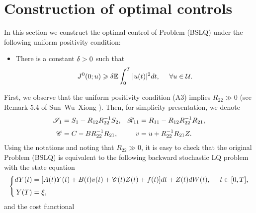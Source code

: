 \documentclass[11pt,times,twoside]{article}
\def\dbE{\mathbb{E}} \def\sE{\mathscr{E}} \def\fE{\mathfrak{E}} \def\cE{{\cal E}} \def\BE{{\bf E}} \def\Be{{\bf e}}
\def\ges{\geqslant}       \def\esssup{\mathop{\rm esssup}}   \def\[{\Big[}
\def\ba{\begin{aligned}}              \def\ea{\end{aligned}}
\begin{document}
\section{Construction of optimal controls}

In this section we construct the optimal control of Problem (BSLQ) under the following uniform
positivity condition:
%
\begin{itemize}
  \item [\bf{(A3)}] There is a constant $\delta>0$ such that
      \begin{equation}\label{A3}
        J^0(0;u)\ges\d\dbE\int_0^T|u(t)|^2dt,\q~\forall u\in\cU.
      \end{equation}
%
\end{itemize}
%
First, we observe that the uniform positivity condition (A3) implies $R_{22}\gg0$ (see Remark 5.4 of Sun--Wu--Xiong \cite{Sun-Wu-Xiong2021}).
Then, for simplicity presentation, we denote
%
\begin{equation}\label{4.21}
\begin{aligned}
\ds \mathscr{S}_{1} &= S_{1}-R_{12}R_{22}^{-1}S_{2},
&\mathscr{R}_{11}&=R_{11}-R_{12}R_{22}^{-1}R_{21}, \\
\ns\ds \mathscr{C}     &= C-B R_{22}^{-1} R_{21}, & v &=u+R_{22}^{-1} R_{21} Z.
\end{aligned}
\end{equation}
%
Using the notations  and noting that $R_{22}\gg0$, it is easy to check that the original Problem (BSLQ) is equivalent to the following backward stochastic LQ problem with the state equation
%
\begin{equation}\label{4.22}\left\{\ba
\ds dY(t) &=[A(t) Y(t)+B(t) v(t)+\mathscr{C}(t) Z(t) +f(t)] d t+Z(t) d W(t),\q~t\in[0,T], \\
\ns\ds  Y(T) &=\xi,
\ea\right.\end{equation}
%
and the cost functional
%
\end{document}
